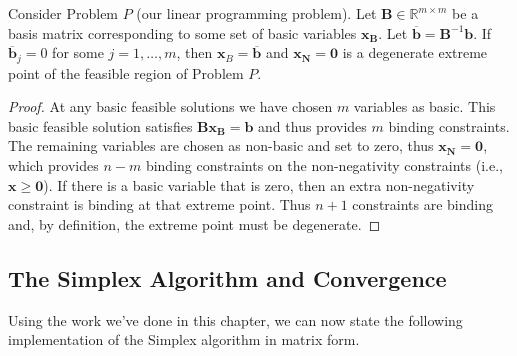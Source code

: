 \begin{theorem} Consider Problem $P$ (our linear programming problem). Let $\mathbf{B} \in \mathbb{R}^{m\times m}$ be a basis matrix corresponding to some set of basic variables $\mathbf{x_B}$. Let $\overline{\mathbf{b}} = \mathbf{B}^{-1}\mathbf{b}$. If $\overline{\mathbf{b}}_j = 0$ for some $j=1,\dots,m$, then $\mathbf{x}_B = \overline{\mathbf{b}}$ and $\mathbf{x_N} = \mathbf{0}$ is a degenerate extreme point of the feasible region of Problem $P$.
\label{thm:DegeneracyDef}
\end{theorem}
\begin{proof} At any basic feasible solutions we have chosen $m$ variables as basic. This basic feasible solution satisfies $\mathbf{B}\mathbf{x_B} = \mathbf{b}$ and thus provides $m$ binding constraints. The remaining variables are chosen as non-basic and set to zero, thus $\mathbf{x_N} = \mathbf{0}$, which provides $n-m$ binding constraints on the non-negativity constraints (i.e., $\mathbf{x} \geq \mathbf{0}$). If there is a basic variable that is zero, then an extra non-negativity constraint is binding at that extreme point. Thus $n+1$ constraints are binding and, by definition, the extreme point must be degenerate. 
\end{proof}

\subsection{The Simplex Algorithm and Convergence}
Using the work we've done in this chapter, we can now state the following implementation of the Simplex algorithm in matrix form. 

